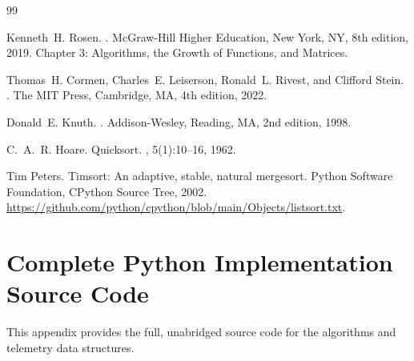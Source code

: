 \documentclass[11pt,a4paper,oneside]{report}
\theoremstyle{definition}
\begin{document}
\begin{thebibliography}{99}

Kenneth~H. Rosen.
.
\newblock McGraw-Hill Higher Education, New York, NY, 8th edition, 2019.
\newblock Chapter 3: Algorithms, the Growth of Functions, and Matrices.

Thomas~H. Cormen, Charles~E. Leiserson, Ronald~L. Rivest, and Clifford Stein.
.
\newblock The MIT Press, Cambridge, MA, 4th edition, 2022.

Donald~E. Knuth.
.
\newblock Addison-Wesley, Reading, MA, 2nd edition, 1998.

C.~A.~R. Hoare.
\newblock Quicksort.
, 5(1):10--16, 1962.

Tim Peters.
\newblock Timsort: An adaptive, stable, natural mergesort.
\newblock Python Software Foundation, CPython Source Tree, 2002.
\newblock \url{https://github.com/python/cpython/blob/main/Objects/listsort.txt}.

\end{thebibliography}

\appendix
\chapter{Complete Python Implementation Source Code}
\label{app:code}

This appendix provides the full, unabridged source code for the algorithms and telemetry data structures.
\end{document}
